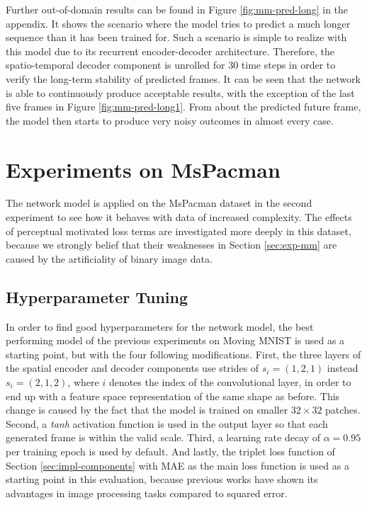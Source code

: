 Further out-of-domain results can be found in Figure \ref{fig:mm-pred-long} in the appendix. It shows the scenario where the model tries to predict a much longer sequence than it has been trained for. Such a scenario is simple to realize with this model due to its recurrent encoder-decoder architecture. Therefore, the spatio-temporal decoder component is unrolled for \num{30} time steps in order to verify the long-term stability of predicted frames. It can be seen that the network is able to continuously produce acceptable results, with the exception of the last five frames in Figure \ref{fig:mm-pred-long1}. From about the  predicted future frame, the model then starts to produce very noisy outcomes in almost every case.






























\section{Experiments on MsPacman} \label{sec:exp-pac}

The network model is applied on the MsPacman dataset in the second experiment to see how it behaves with data of increased complexity. The effects of perceptual motivated loss terms are investigated more deeply in this dataset, because we strongly belief that their weaknesses in Section \ref{sec:exp-mm} are caused by the artificiality of binary image data.


\subsection{Hyperparameter Tuning} \label{sec:hyper_pac}

In order to find good hyperparameters for the network model, the best performing model of the previous experiments on Moving MNIST is used as a starting point, but with the four following modifications. First, the three layers of the spatial encoder and decoder components use strides of $s_i=(1, 2, 1)$ instead $s_i=(2, 1, 2)$, where $i$ denotes the index of the convolutional layer, in order to end up with a feature space representation of the same shape as before. This change is caused by the fact that the model is trained on smaller $32 \times 32$ patches. Second, a \textit{tanh} activation function is used in the output layer so that each generated frame is within the valid scale. Third, a learning rate decay of $\alpha=0.95$ per training epoch is used by default. And lastly, the triplet loss function of Section \ref{sec:impl-components} with MAE as the main loss function is used as a starting point in this evaluation, because previous works have shown its advantages in image processing tasks compared to squared error.

